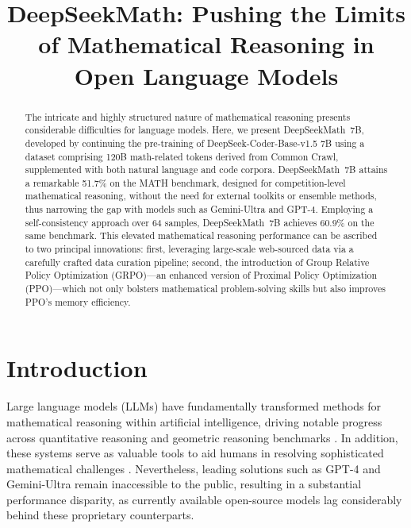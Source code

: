 \title{DeepSeekMath: Pushing the Limits of Mathematical Reasoning in Open Language Models}

\begin{abstract}
The intricate and highly structured nature of mathematical reasoning presents considerable difficulties for language models. Here, we present DeepSeekMath~7B, developed by continuing the pre-training of DeepSeek-Coder-Base-v1.5 7B using a dataset comprising 120B math-related tokens derived from Common Crawl, supplemented with both natural language and code corpora. DeepSeekMath~7B attains a remarkable 51.7\% on the MATH benchmark, designed for competition-level mathematical reasoning, without the need for external toolkits or ensemble methods, thus narrowing the gap with models such as Gemini-Ultra and GPT-4. Employing a self-consistency approach over 64 samples, DeepSeekMath~7B achieves 60.9\% on the same benchmark. This elevated mathematical reasoning performance can be ascribed to two principal innovations: first, leveraging large-scale web-sourced data via a carefully crafted data curation pipeline; second, the introduction of Group Relative Policy Optimization (GRPO)—an enhanced version of Proximal Policy Optimization (PPO)—which not only bolsters mathematical problem-solving skills but also improves PPO’s memory efficiency.
\end{abstract}

\section{Introduction}

Large language models (LLMs) have fundamentally transformed methods for mathematical reasoning within artificial intelligence, driving notable progress across quantitative reasoning \citep{MATH} and geometric reasoning benchmarks \citep{trinh2024solving}. In addition, these systems serve as valuable tools to aid humans in resolving sophisticated mathematical challenges \citep{tao}. Nevertheless, leading solutions such as GPT-4 \citep{gpt4} and Gemini-Ultra \citep{gemini} remain inaccessible to the public, resulting in a substantial performance disparity, as currently available open-source models lag considerably behind these proprietary counterparts.

